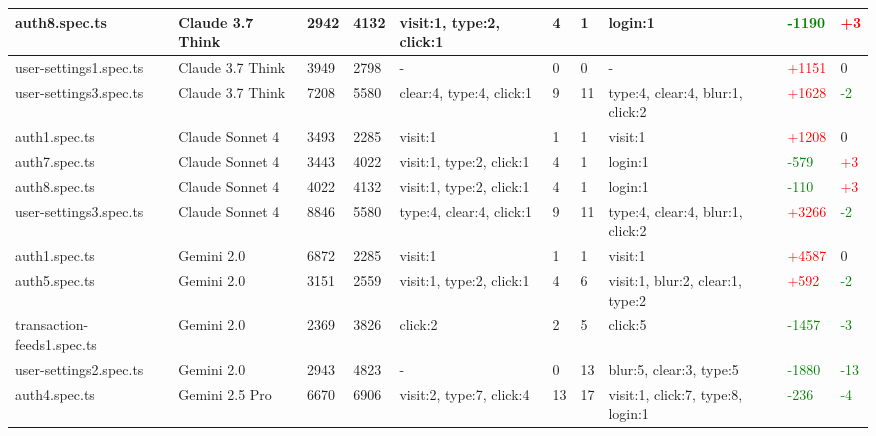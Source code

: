 \documentclass{article}
\begin{document}
\begin{landscape}
\begin{longtable}{|p{2.5cm}|p{1.5cm}|p{1cm}|p{1cm}|p{2cm}|p{1cm}|p{1cm}|p{2cm}|p{1.5cm}|p{1.5cm}|}
auth8.spec.ts & Claude 3.7 Think & 2942 & 4132 & visit:1, type:2, click:1 & 4 & 1 & login:1 & \textcolor{green}{-1190} & \textcolor{red}{+3} \\
\hline

user-settings1.spec.ts & Claude 3.7 Think & 3949 & 2798 & - & 0 & 0 & - & \textcolor{red}{+1151} & 0 \\
\hline

user-settings3.spec.ts & Claude 3.7 Think & 7208 & 5580 & clear:4, type:4, click:1 & 9 & 11 & type:4, clear:4, blur:1, click:2 & \textcolor{red}{+1628} & \textcolor{green}{-2} \\
\hline

auth1.spec.ts & Claude Sonnet 4 & 3493 & 2285 & visit:1 & 1 & 1 & visit:1 & \textcolor{red}{+1208} & 0 \\
\hline

auth7.spec.ts & Claude Sonnet 4 & 3443 & 4022 & visit:1, type:2, click:1 & 4 & 1 & login:1 & \textcolor{green}{-579} & \textcolor{red}{+3} \\
\hline

auth8.spec.ts & Claude Sonnet 4 & 4022 & 4132 & visit:1, type:2, click:1 & 4 & 1 & login:1 & \textcolor{green}{-110} & \textcolor{red}{+3} \\
\hline

user-settings3.spec.ts & Claude Sonnet 4 & 8846 & 5580 & type:4, clear:4, click:1 & 9 & 11 & type:4, clear:4, blur:1, click:2 & \textcolor{red}{+3266} & \textcolor{green}{-2} \\
\hline

auth1.spec.ts & Gemini 2.0 & 6872 & 2285 & visit:1 & 1 & 1 & visit:1 & \textcolor{red}{+4587} & 0 \\
\hline

auth5.spec.ts & Gemini 2.0 & 3151 & 2559 & visit:1, type:2, click:1 & 4 & 6 & visit:1, blur:2, clear:1, type:2 & \textcolor{red}{+592} & \textcolor{green}{-2} \\
\hline

transaction-feeds1.spec.ts & Gemini 2.0 & 2369 & 3826 & click:2 & 2 & 5 & click:5 & \textcolor{green}{-1457} & \textcolor{green}{-3} \\
\hline

user-settings2.spec.ts & Gemini 2.0 & 2943 & 4823 & - & 0 & 13 & blur:5, clear:3, type:5 & \textcolor{green}{-1880} & \textcolor{green}{-13} \\
\hline

auth4.spec.ts & Gemini 2.5 Pro & 6670 & 6906 & visit:2, type:7, click:4 & 13 & 17 & visit:1, click:7, type:8, login:1 & \textcolor{green}{-236} & \textcolor{green}{-4} \\
\hline


\end{longtable}
\end{landscape}
\end{document}
